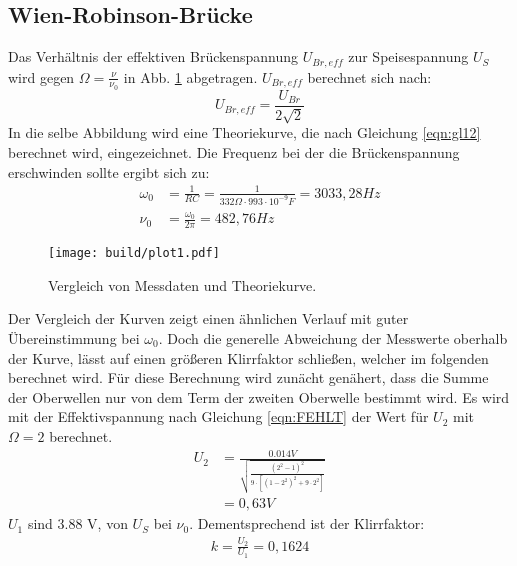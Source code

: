 \subsection{Wien-Robinson-Brücke}
\label{sec:Wien}
Das Verhältnis der effektiven Brückenspannung $U_{Br,eff}$ zur Speisespannung $U_S$ wird gegen $\Omega = \frac{\nu}{\nu_0}$ in Abb. \ref{fig:plot} abgetragen.
$U_{Br,eff}$ berechnet sich nach:
\begin{equation}
  U_{Br,eff} = \frac{U_{Br}}{2 \sqrt{2}}
\end{equation}
In die selbe Abbildung wird eine Theoriekurve, die nach Gleichung \eqref{eqn:gl12} berechnet wird, eingezeichnet.
Die Frequenz bei der die Brückenspannung erschwinden sollte ergibt sich zu:
\begin{align}
  \omega_0 &= \frac{1}{RC} = \frac{1}{332 \Omega \cdot 993 \cdot 10^{-9} F} = 3033,28 Hz \\
  \nu_0 &= \frac{\omega_0}{2 \pi} = 482,76 Hz
\end{align}
\newpage
\begin{figure}
  \centering
  \texttt{[image: build/plot1.pdf]}
  \caption{Vergleich von Messdaten und Theoriekurve.}
  \label{fig:plot}
\end{figure}
Der Vergleich der Kurven zeigt einen ähnlichen Verlauf mit guter Übereinstimmung bei $\omega_0$.
Doch die generelle Abweichung der Messwerte oberhalb der Kurve, lässt auf einen größeren Klirrfaktor schließen, welcher im folgenden berechnet wird.
Für diese Berechnung wird zunächt genähert, dass die Summe der Oberwellen nur von dem Term der zweiten Oberwelle bestimmt wird.
Es wird mit der Effektivspannung nach Gleichung \ref{eqn:FEHLT} der Wert für $U_2$ mit $\Omega = 2$ berechnet.
\begin{align}
  U_2 &= \frac{0.014 V}{\sqrt{\frac{(2^2-1)^2}{9 \cdot [(1-2^2)^2+9 \cdot 2^2]}}} \\
  &= 0,63 V
\end{align}
$U_1$ sind 3.88 V, von $U_S$ bei $\nu_0$.
Dementsprechend ist der Klirrfaktor:
\begin{align}
  k = \frac{U_2}{U_1} = 0,1624
\end{align}

